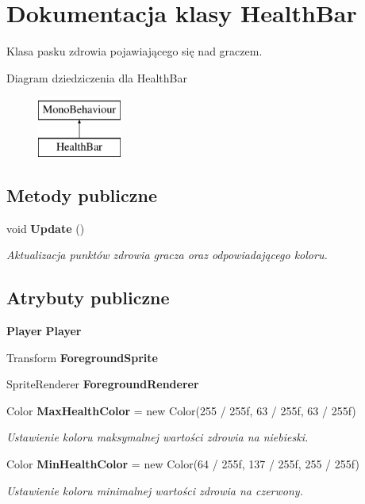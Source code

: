 \section{Dokumentacja klasy Health\+Bar}
\label{class_health_bar}


Klasa pasku zdrowia pojawiającego się nad graczem.  


Diagram dziedziczenia dla Health\+Bar\begin{figure}[H]
\begin{center}
\leavevmode
\includegraphics[height=2.000000cm]{class_health_bar}
\end{center}
\end{figure}
\subsection*{Metody publiczne}
\begin{DoxyCompactItemize}
\item 
void {\bf Update} ()
\begin{DoxyCompactList}\small\item\em Aktualizacja punktów zdrowia gracza oraz odpowiadającego koloru. \end{DoxyCompactList}\end{DoxyCompactItemize}
\subsection*{Atrybuty publiczne}
\begin{DoxyCompactItemize}
\item 
{\bf Player} {\bfseries Player}\label{class_health_bar_ab10e19888af476521d8670c9b3f7e714}

\item 
Transform {\bfseries Foreground\+Sprite}\label{class_health_bar_a847748e2e7f8258d45a60ceca229443b}

\item 
Sprite\+Renderer {\bfseries Foreground\+Renderer}\label{class_health_bar_acb0f75afdd7dbca7e1b162ee3809d0b4}

\item 
Color {\bf Max\+Health\+Color} = new Color(255 / 255f, 63 / 255f, 63 / 255f)
\begin{DoxyCompactList}\small\item\em Ustawienie koloru maksymalnej wartości zdrowia na niebieski. \end{DoxyCompactList}\item 
Color {\bf Min\+Health\+Color} = new Color(64 / 255f, 137 / 255f, 255 / 255f)
\begin{DoxyCompactList}\small\item\em Ustawienie koloru minimalnej wartości zdrowia na czerwony. \end{DoxyCompactList}\end{DoxyCompactItemize}


